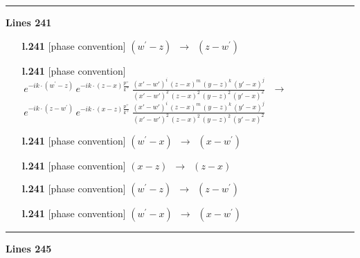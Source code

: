 \documentclass[10pt]{article}
\begin{document}
\noindent\rule{\linewidth}{0.3pt}\par\noindent\textbf{Lines 241} \par
\begin{itemize}[leftmargin=2.2em,itemsep=1pt,topsep=2pt]
\item[\textbf{l.241}] \textsf{\small [phase convention]} $\displaystyle (w^\prime-z)$\ $\longrightarrow$\ $\displaystyle (z-w^\prime)$
\item[\textbf{l.241}] \textsf{\small [phase convention]} $\displaystyle \,e^{-ik\cdot (w^\prime-z)}\,e^{-ik\cdot (z-x)\frac{p^{+}}{k^{+}}}\,\frac{(x'-w')^{i}\,(z-x)^{m}\,(y-z)^{k}\,(y'-x)^{j}}{(x'-w')^{2}\,(z-x)^{2}\,(y-z)^{2}\,(y'-x)^{2}}\,$\ $\longrightarrow$\ $\displaystyle \,e^{-ik\cdot (z-w^\prime)}\,e^{-ik\cdot (x-z)\frac{p^{+}}{k^{+}}}\,\frac{(x'-w')^{i}\,(z-x)^{m}\,(y-z)^{k}\,(y'-x)^{j}}{(x'-w')^{2}\,(z-x)^{2}\,(y-z)^{2}\,(y'-x)^{2}}\,$
\item[\textbf{l.241}] \textsf{\small [phase convention]} $\displaystyle (w^\prime-x)$\ $\longrightarrow$\ $\displaystyle (x-w^\prime)$
\item[\textbf{l.241}] \textsf{\small [phase convention]} $\displaystyle (x-z)$\ $\longrightarrow$\ $\displaystyle (z-x)$
\item[\textbf{l.241}] \textsf{\small [phase convention]} $\displaystyle (w^\prime-z)$\ $\longrightarrow$\ $\displaystyle (z-w^\prime)$
\item[\textbf{l.241}] \textsf{\small [phase convention]} $\displaystyle (w^\prime-x)$\ $\longrightarrow$\ $\displaystyle (x-w^\prime)$
\end{itemize}
\noindent\rule{\linewidth}{0.3pt}\par\noindent\textbf{Lines 245} \par
\end{document}
